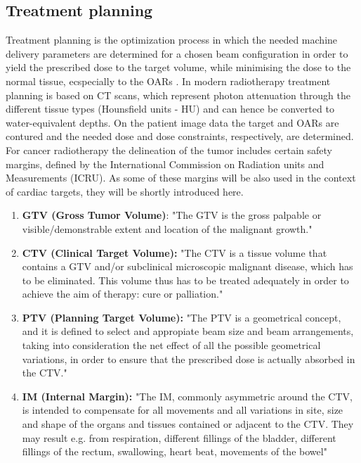 \subsection{Treatment planning}
\label{tp}
Treatment planning is the optimization process in which the needed machine delivery parameters are determined for a chosen beam 
configuration in order to yield the prescribed dose to the target volume, while minimising the dose to the normal tissue, ecspecially 
to the OARs \cite{Ric12}. In modern radiotherapy treatment planning is based on CT scans, which represent photon attenuation through 
the different tissue types (Hounsfield units - HU) and can hence be converted to water-equivalent depths. On the patient image data the 
target and OARs are contured and the needed dose and dose constraints, respectively, are determined. For cancer radiotherapy the delineation 
of the tumor includes certain safety margins, defined by the International Commission on Radiation units and Measurements (ICRU). As some 
of these margins will be also used in the context of cardiac targets, they will be shortly introduced here. 

\begin{enumerate}
 \item [] \textbf{GTV (Gross Tumor Volume)}: "The GTV is the gross palpable or visible/demonstrable extent and location of the malignant 
 growth." \cite{ICRU93a}
 \item [] \textbf{CTV (Clinical Target Volume):} "The CTV is a tissue volume that contains a GTV and/or subclinical microscopic malignant 
 disease, which has to be eliminated. This volume thus has to be treated adequately in order to achieve the aim of therapy: cure or 
 palliation." \cite{ICRU93a}
 \item[] \textbf{PTV (Planning Target Volume):} "The PTV is a geometrical concept, and it is defined to select and appropiate beam size 
 and beam arrangements, taking into consideration the net effect of all the possible geometrical variations, in order to ensure that the 
 prescribed dose is actually absorbed in the CTV." \cite{ICRU93a}
 \item[] \textbf{IM (Internal Margin):} "The IM, commonly asymmetric around the CTV, is intended to compensate for all movements and all 
 variations in site, size and shape of the organs and tissues contained or adjacent to the CTV. They may result e.g. from respiration, 
 different fillings of the bladder, different fillings of the rectum, swallowing, heart beat, movements of the bowel" \cite{ICRU99}
\end{enumerate}

